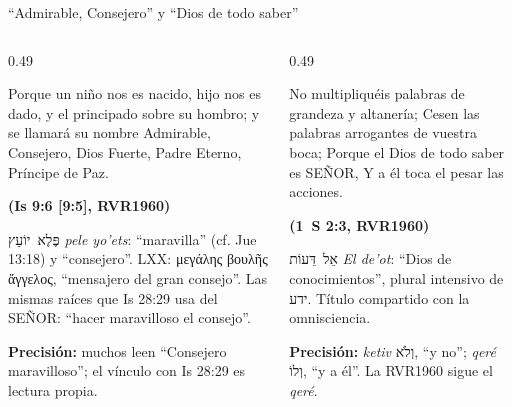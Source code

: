 \documentclass[hyperref={bookmarks=false},aspectratio=169]{beamer}
\newcommand{\heb}[1]{\mbox{\foreignlanguage{hebrew}{#1}}}
\newcommand{\grc}[1]{\foreignlanguage{ancientgreek}{#1}}
\newcommand{\SENOR}{S{\fontsize{0.78em}{1em}\selectfont EÑOR}}
\newcommand{\fuente}[1]{\par\hfill{\upshape\bfseries\footnotesize\textcolor{azul}{#1}}}
\newcommand{\precision}[1]{{\footnotesize\color{gris}\textbf{Precisión:} #1}}
\begin{document}
\begin{frame}{``Admirable, Consejero'' y ``Dios de todo saber''}
\begin{columns}[t,onlytextwidth]
\begin{column}{0.49\textwidth}
\begin{cita}Porque un niño nos es nacido, hijo nos es dado, y el principado sobre su hombro; y se llamará su nombre Admirable, Consejero, Dios Fuerte, Padre Eterno, Príncipe de Paz.\fuente{(Is 9:6 [9:5], RVR1960)}\end{cita}
\scriptsize\heb{פֶּלֶא יוֹעֵץ} \emph{pele yo'ets}: ``maravilla'' (cf. Jue 13:18) y ``consejero''. LXX: \grc{μεγάλης βουλῆς ἄγγελος}, ``mensajero del gran consejo''. Las mismas raíces que Is 28:29 usa del \SENOR{}: ``hacer maravilloso el consejo''.\par\smallskip
\precision{muchos leen ``Consejero maravilloso''; el vínculo con Is 28:29 es lectura propia.}
\end{column}
\begin{column}{0.49\textwidth}
\begin{cita}No multipliquéis palabras de grandeza y altanería; Cesen las palabras arrogantes de vuestra boca; Porque el Dios de todo saber es \SENOR{}, Y a él toca el pesar las acciones.\fuente{(1~S 2:3, RVR1960)}\end{cita}
\scriptsize\heb{אֵל דֵּעוֹת} \emph{El de'ot}: ``Dios de conocimientos'', plural intensivo de \heb{ידע}. Título compartido con la omnisciencia.\par\smallskip
\precision{\emph{ketiv} \heb{וְלֹא}, ``y no''; \emph{qeré} \heb{וְלוֹ}, ``y a él''. La RVR1960 sigue el \emph{qeré}.}
\end{column}
\end{columns}
\end{frame}
\end{document}
